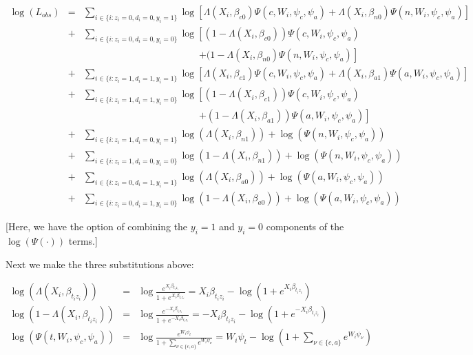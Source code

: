 \documentclass[12pt]{article}
\begin{document}
\begin{eqnarray*}
\log(L_{obs}) & = & \sum_{i \in \{i:z_i=0,d_i=0,y_i=1\}} \log\left[
\Lambda(X_i,\beta_{c0}) \Psi(c, W_i,
\psi_c,\psi_a) + \Lambda(X_i,\beta_{n0}) \Psi(n,
W_i, \psi_c,\psi_a) \right] \\
& + & \sum_{i \in \{i:z_i=0,d_i=0,y_i=0\}} \log\left[
(1-\Lambda(X_i,\beta_{c0}))  \Psi(c, W_i,
\psi_c,\psi_a) \right. \\
&  & \qquad\qquad\qquad\qquad\qquad\qquad \left. + (1-\Lambda(X_i,\beta_{n0})
\Psi(n, W_i, \psi_c,\psi_a) \right] \\
& + & \sum_{i \in \{i:z_i=1,d_i=1,y_i=1\}} \log\left[
\Lambda(X_i,\beta_{c1}) \Psi(c, W_i,
\psi_c,\psi_a) + \Lambda(X_i,\beta_{a1}) \Psi(a,
W_i, \psi_c,\psi_a) \right] \\
& + & \sum_{i \in \{i:z_i=1,d_i=1,y_i=0\}} \log\left[
(1-\Lambda(X_i,\beta_{c1})) \Psi(c, W_i,
\psi_c,\psi_a) \right. \\
&  & \qquad\qquad\qquad\qquad\qquad\qquad \left. + (1-\Lambda(X_i,\beta_{a1})) \Psi(a,
W_i, \psi_c,\psi_a) \right] \\
& + & \sum_{i \in \{i:z_i=1,d_i=0, y_i=1\}} \log(
\Lambda(X_i,\beta_{n1})) + \log(\Psi(n, W_i, \psi_c,\psi_a)) \\
& + & \sum_{i \in \{i:z_i=1,d_i=0, y_i=0\}}
\log(1-\Lambda(X_i,\beta_{n1})) + \log( \Psi(n, W_i, \psi_c,\psi_a)) \\
& + & \sum_{i \in \{i:z_i=0,d_i=1, y_i=1\}} \log(
\Lambda(X_i,\beta_{a0})) + \log( \Psi(a, W_i, \psi_c,\psi_a)) \\
& + & \sum_{i \in \{i:z_i=0,d_i=1, y_i=0\}}
\log(1-\Lambda(X_i,\beta_{a0})) + \log( \Psi(a, W_i, \psi_c,\psi_a)) 
\end{eqnarray*}

[Here, we have the option of combining the $y_i=1$ and $y_i=0$
components of the $\log(\Psi(\cdot))$ terms.]

Next we make the three substitutions above:

\begin{eqnarray*}
\log (\Lambda(X_i,\beta_{t_iz_i})) & = & \log
\frac{e^{X_i\beta_{t_iz_i}}}{1+ e^{X_i\beta_{t_iz_i}}} =
X_i\beta_{t_iz_i} - \log(1+ e^{X_i\beta_{t_iz_i}}) \\
\log(1-\Lambda(X_i,\beta_{t_iz_i})) 
& = & \log \frac{e^{-X_i\beta_{t_iz_i}}}{1+ e^{-X_i\beta_{t_iz_i}}} =
-X_i\beta_{t_iz_i} - \log(1+ e^{-X_i\beta_{t_iz_i}}) \\
\log (\Psi(t, W_i, \psi_c,\psi_a)) 
& = & \log \frac{e^{W_i \psi_t}}{1+\sum_{\nu \in \{c,a\}} e^{W_i
\psi_{\nu}}} = W_i \psi_t - \log (1+\sum_{\nu \in \{c,a\}} e^{W_i
\psi_{\nu}})
\end{eqnarray*}
\end{document}
